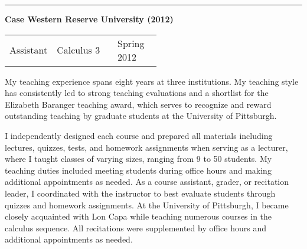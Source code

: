 \documentclass[a4paper,11pt]{article}
\begin{document}
\noindent\rule{15cm}{0.4pt}

\textbf{Case Western Reserve University (2012)}

\begin{tabular}{p{0.11\linewidth}p{0.4\linewidth}p{.2\linewidth}}
	Assistant & Calculus 3  & Spring 2012
\end{tabular}

\vspace{1cm}

My teaching experience spans eight years at three institutions. My teaching style has consistently led to strong teaching evaluations and a shortlist for the Elizabeth Baranger teaching award, which serves to recognize and reward outstanding teaching by graduate students at the University of Pittsburgh.

I independently designed each course and prepared all materials including lectures, quizzes, tests, and homework assignments when serving as a lecturer, where I taught classes of varying sizes, ranging from 9 to 50 students. My teaching duties included meeting students during office hours and making additional appointments as needed.  As a course assistant, grader, or recitation leader, I coordinated with the instructor to best evaluate students through quizzes and homework assignments. At the University of Pittsburgh, I became closely acquainted with Lon Capa while teaching numerous courses in the calculus sequence. All recitations were supplemented by office hours and additional appointments as needed.

 
\end{document}
